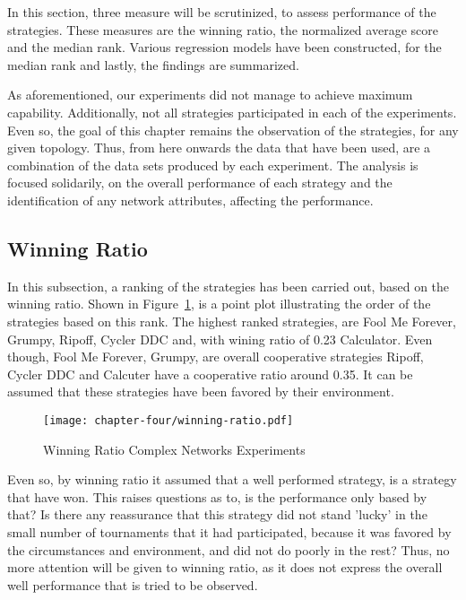In this section, three measure will be scrutinized, to assess performance of the
strategies. These measures are the winning ratio, the normalized average score
and the median rank. Various regression models have been constructed, for
the median rank and lastly, the findings are summarized.

As aforementioned, our experiments did not manage to achieve maximum capability.
Additionally, not all strategies participated in each of the experiments.
Even so, the goal of this chapter remains the observation of the strategies,
for any given topology. Thus, from here onwards the data that have been
used, are a combination of the data sets produced by each experiment. The
analysis is focused solidarily, on the overall performance of each strategy and
the identification of any network attributes, affecting the performance.

\subsection{Winning Ratio}

In this subsection, a ranking of the strategies has been carried out, based on
the winning ratio. Shown in Figure~\ref{wining-second-gen}, is a point plot illustrating the order
of the strategies based on this rank. The highest ranked strategies, are
Fool Me Forever, Grumpy, Ripoff, Cycler DDC and, with wining ratio
of 0.23 Calculator. Even though, Fool Me Forever, Grumpy, are overall cooperative
strategies Ripoff, Cycler DDC and Calcuter have a cooperative ratio around
0.35. It can be assumed that these strategies have been favored by their environment.

\begin{figure}[!hbtp]
	\texttt{[image: chapter-four/winning-ratio.pdf]}
	\caption{Winning Ratio Complex Networks Experiments}
	\label{wining-second-gen}
\end{figure}

Even so, by winning ratio it assumed that a well performed strategy, is a strategy
that have won. This raises questions as to, is the performance only based by that?
Is there any reassurance that this strategy did not stand 'lucky' in the small
number of tournaments that it had participated, because it was favored by
the circumstances and environment, and did not do poorly in the rest?
Thus, no more attention will be given to winning ratio, as it does not express
the overall well performance that is tried to be observed.

